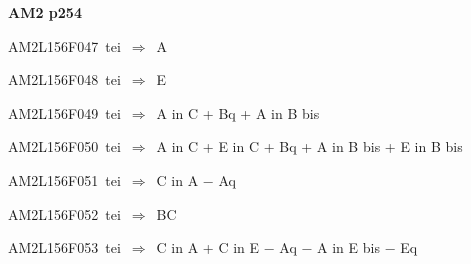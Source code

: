 \par\vfill\eject
{\bf\hfill AM2 p254\hfill\hbox{}}\par\bigskip
{\sixrm AM2L156F047\ {\sixit tei}\ }$\Rightarrow$\ {\tenit A}\par\smallskip
{\sixrm AM2L156F048\ {\sixit tei}\ }$\Rightarrow$\ {\tenit E}\par\smallskip
{\sixrm AM2L156F049\ {\sixit tei}\ }$\Rightarrow$\ {\tenit A} {\tenit in} {\tenit C} + {\tenit Bq} + {\tenit A} {\tenit in} {\tenit B} {\tenit bis}\par\smallskip
{\sixrm AM2L156F050\ {\sixit tei}\ }$\Rightarrow$\ {\tenit A} {\tenit in} {\tenit C} + {\tenit E} {\tenit in} {\tenit C} + {\tenit Bq} + {\tenit A} {\tenit in} {\tenit B} {\tenit bis} + {\tenit E} {\tenit in} {\tenit B} {\tenit bis}\par\smallskip
{\sixrm AM2L156F051\ {\sixit tei}\ }$\Rightarrow$\ {\tenit C} {\tenit in} {\tenit A} − {\tenit Aq}\par\smallskip
{\sixrm AM2L156F052\ {\sixit tei}\ }$\Rightarrow$\ BC\par\smallskip
{\sixrm AM2L156F053\ {\sixit tei}\ }$\Rightarrow$\ {\tenit C} {\tenit in} {\tenit A} + {\tenit C} {\tenit in} {\tenit E} − {\tenit Aq} − {\tenit A} {\tenit in} {\tenit E} {\tenit bis} − {\tenit Eq}\par\smallskip

